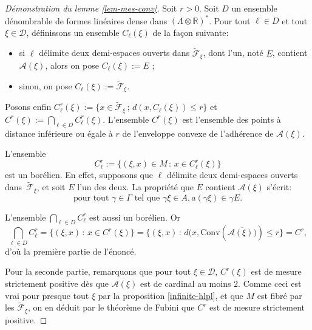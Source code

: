 \documentclass[JEP,XML,SOM,Unicode,francais,published]{cedram}
\newcommand{\R}{\mathbb{R}}
\newcommand{\Hp}{\tilde{\mathscr{F}}}
\theoremstyle{definition}
\begin{document}
\begin{proof}[Démonstration du lemme \ref{lem-mes-conv}]
Soit $r > 0$. Soit $D$ un ensemble dénombrable de formes linéaires dense dans $(\Lambda\otimes\R)^{*}$. Pour tout $\ell \in D$ et tout $\xi \in \mathscr{D}$, définissons un ensemble $C_\ell(\xi)$ de la façon suivante:
\begin{itemize}
\item si $\ell$ délimite deux demi-espaces ouverts dans $\Hp_\xi$, dont l'un, noté $E$, contient $\mathscr{A}(\xi)$, alors
on pose $C_\ell(\xi):= E$ ;
\item sinon, on pose $C_\ell(\xi):= \Hp_\xi$.
\end{itemize}
Posons enfin $C_\ell^r(\xi):= \{x\in\Hp_\xi\,;\,d(x, C_\ell(\xi)) \leq r\}$ et $C^r(\xi):= \bigcap_{\ell \in D} C_\ell^r(\xi)$. L'ensemble $C^r(\xi)$ est l'ensemble des points à distance inférieure ou égale à $r$ de l'enveloppe convexe de l'adhérence de $\mathscr{A}(\xi)$.

L'ensemble
\[C_\ell^r:= \{(\xi, x) \in M\,:\,x \in C_\ell^r(\xi)\}\]
est un borélien. En effet, supposons que $\ell$ délimite deux demi-espaces ouverts dans~$\tilde{\mathscr{F}}_\xi$, et soit $E$ l'un des deux. La propriété que $E$ contient $\mathscr{A}(\xi)$ s'écrit:
\[\text{pour tout }\gamma \in \Gamma\text{ tel que }\gamma \xi \in A, a(\gamma\xi) \in \gamma E.\]

L'ensemble $\bigcap_{\ell \in D} C^r_\ell$ est aussi un borélien. Or
\[\bigcap_{\ell \in D} C^r_\ell = \{(\xi, x)\,:\,x \in C^r(\xi)\} = \{(\xi, x)\,:\,d(x, \mathrm{Conv}(\overline{\mathscr{A}(\xi))}) \leq r\} = C^r,\] d'où la première partie de l'énoncé.

Pour la seconde partie, remarquons que pour tout $\xi \in \mathscr{D}$, $C^r(\xi)$ est de mesure strictement positive dès que $\mathscr{A}(\xi)$ est de cardinal au moins $2$. Comme ceci est vrai pour presque tout $\xi$ par la proposition \ref{infinite-hlpl}, et que $M$ est fibré par les $\tilde{\mathscr{F}}_\xi$, on en déduit par le théorème de Fubini que $C^r$ est de mesure strictement positive.
\end{proof}

\backmatter


\end{document}
